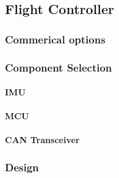 \subsection{Flight Controller}
\subsubsection{Commerical options}
\subsubsection{Component Selection}
\paragraph{\gls{IMU}}
\paragraph{\gls{MCU}}
\paragraph{\gls{CAN} Transceiver}
\subsubsection{Design}

